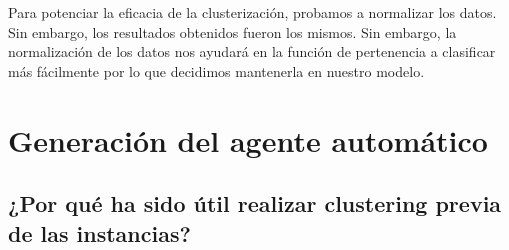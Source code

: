 \documentclass[12pt]{article}
\begin{document}

Para potenciar la eficacia de la clusterización, probamos a normalizar los datos. Sin embargo, los resultados obtenidos fueron los mismos. Sin embargo, la normalización de los datos nos ayudará en la función de pertenencia a clasificar más fácilmente por lo que decidimos mantenerla en nuestro modelo.





\newpage

\section{Generación del agente automático}




\subsection{¿Por qué ha sido útil realizar clustering previa de las instancias?}

\end{document}
